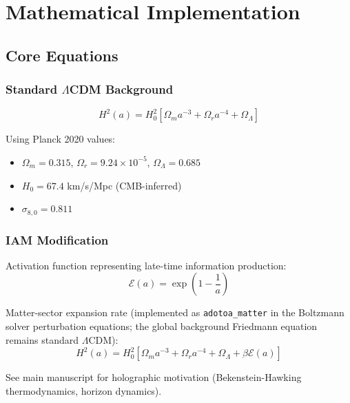 \documentclass[11pt]{article}
\begin{document}
\section{Mathematical Implementation}

\subsection{Core Equations}

\subsubsection{Standard $\Lambda$CDM Background}

\begin{equation}
H^2(a) = H_0^2 \left[ \Omega_m a^{-3} + \Omega_r a^{-4} + \Omega_\Lambda \right]
\end{equation}

\noindent Using Planck 2020 values:
\begin{itemize}
    \item $\Omega_m = 0.315$, $\Omega_r = 9.24 \times 10^{-5}$, $\Omega_\Lambda = 0.685$
    \item $H_0 = 67.4$ km/s/Mpc (CMB-inferred)
    \item $\sigma_{8,0} = 0.811$
\end{itemize}

\subsubsection{IAM Modification}

Activation function representing late-time information production:
\begin{equation}
\mathcal{E}(a) = \exp\left(1 - \frac{1}{a}\right)
\end{equation}

Matter-sector expansion rate (implemented as \texttt{adotoa\_matter} in the Boltzmann solver perturbation equations; the global background Friedmann equation remains standard $\Lambda$CDM):
\begin{equation}
H^2(a) = H_0^2\left[\Omega_m a^{-3} + \Omega_r a^{-4} + \Omega_\Lambda + \beta \mathcal{E}(a)\right]
\end{equation}

\noindent See main manuscript for holographic motivation (Bekenstein-Hawking thermodynamics, horizon dynamics).
\end{document}
